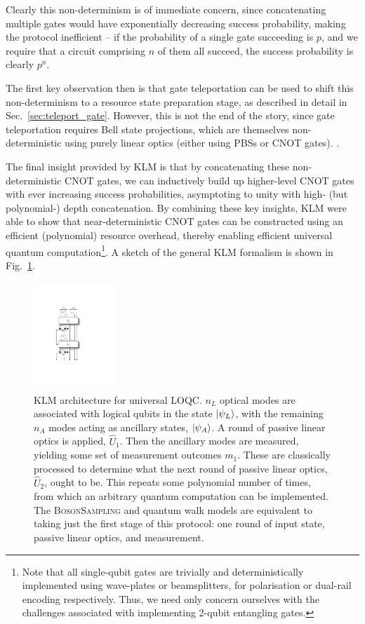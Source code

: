Clearly this non-determinism is of immediate concern, since concatenating multiple gates would have exponentially decreasing success probability, making the protocol inefficient -- if the probability of a single gate succeeding is $p$, and we require that a circuit comprising $n$ of them all succeed, the success probability is clearly $p^n$.

The first key observation then is that gate teleportation can be used to shift this non-determinism to a resource state preparation stage, as described in detail in Sec.~\ref{sec:teleport_gate}. However, this is not the end of the story, since gate teleportation requires Bell state projections, which are themselves non-deterministic using purely linear optics (either using PBSs or CNOT gates). .

The final insight provided by KLM is that by concatenating these non-deterministic CNOT gates, we can inductively build up higher-level CNOT gates with ever increasing success probabilities, asymptoting to unity with high- (but polynomial-) depth concatenation. By combining these key insights, KLM were able to show that near-deterministic CNOT gates can be constructed using an efficient (polynomial) resource overhead, thereby enabling efficient universal quantum computation\footnote{Note that all single-qubit gates are trivially and deterministically implemented using wave-plates or beamsplitters, for polarisation or dual-rail encoding respectively. Thus, we need only concern ourselves with the challenges associated with implementing 2-qubit entangling gates.}. A sketch of the general KLM formalism is shown in Fig.~\ref{fig:KLM_protocol}.

\begin{figure}[!htbp]
\includegraphics[clip=true, width=0.28\textwidth]{KLM}
\captionspacefig \caption{KLM architecture for universal LOQC. $n_L$ optical modes are associated with logical qubits in the state $|\psi_L\rangle$, with the remaining $n_A$ modes acting as ancillary states, $|\psi_A\rangle$. A round of passive linear optics is applied, $\hat{U}_1$. Then the ancillary modes are measured, yielding some set of measurement outcomes $m_1$. These are classically processed to determine what the next round of passive linear optics, $\hat{U}_2$, ought to be. This repeats some polynomial number of times, from which an arbitrary quantum computation can be implemented. The \textsc{BosonSampling} and quantum walk models are equivalent to taking just the first stage of this protocol: one round of input state, passive linear optics, and measurement.} \label{fig:KLM_protocol}
\end{figure}


